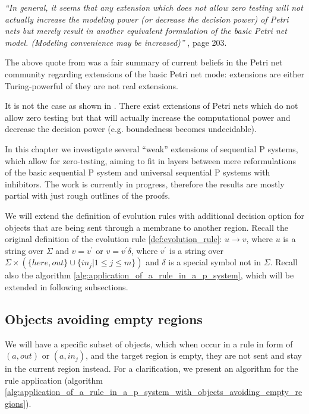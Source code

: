 {\em ``In general, it seems that any extension which does not allow zero testing will not actually increase the modeling power (or decrease the decision power) of Petri nets but merely result in another equivalent formulation of the basic Petri net model. (Modeling convenience may be increased)''} \cite{Peterson81PetriNets}, page 203.

The above quote from \cite{Peterson81PetriNets} was a fair summary of current beliefs in the Petri net community regarding extensions of the basic Petri net mode: extensions are either Turing-powerful of they are not real extensions.

It is not the case as shown in \cite{Dufourd98Reset}. There exist extensions of Petri nets which do not allow zero testing but that will actually increase the computational power and decrease the decision power (e.g. boundedness becomes undecidable).

In this chapter we investigate several ``weak'' extensions of sequential P systems, which allow for zero-testing, aiming to fit in layers between mere reformulations of the basic sequential P system and universal sequential P systems with inhibitors. The work is currently in progress, therefore the results are mostly partial with just rough outlines of the proofs.

We will extend the definition of evolution rules with additional decision option for objects that are being sent through a membrane to another region. Recall the original definition of the evolution rule \ref{def:evolution_rule}: $u\rightarrow v$, where $u$ is a string over $\Sigma$ and $v=v^\prime$ or $v=v^\prime\delta$, where $v^\prime$ is a string over $\Sigma\times(\{here, out\}\cup\{in_j|1\leq j\leq m\})$ and $\delta$ is a special symbol not in $\Sigma$. Recall also the algorithm \ref{alg:application_of_a_rule_in_a_p_system}, which will be extended in following subsections.

\subsection{Objects avoiding empty regions} %
\label{sub:objects_avoiding_empty_regions}

We will have a specific subset of objects, which when occur in a rule in form of $(a, out)$ or $(a, in_j)$, and the target region is empty, they are not sent and stay in the current region instead. For a clarification, we present an algorithm for the rule application  (algorithm \ref{alg:application_of_a_rule_in_a_p_system_with_objects_avoiding_empty_regions}).

